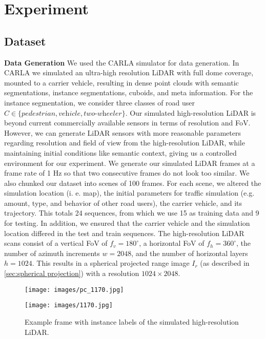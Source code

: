 \section{\large Experiment}
\label{sec:expirement}

\subsection{Dataset}

\textbf{Data Generation}
We used the CARLA simulator for data generation. In CARLA we simulated an ultra-high resolution LiDAR with full dome coverage, mounted to a carrier vehicle, resulting in dense point clouds with semantic segmentations, instance segmentations, cuboids, and meta information. 
For the instance segmentation, we consider three classes of road user $C \in \{\textit{pedestrian},\textit{vehicle},\textit{two-wheeler}\}$. Our simulated high-resolution LiDAR is beyond current commercially available sensors in terms of resolution and FoV. However, we can generate LiDAR sensors with more reasonable parameters regarding resolution and field of view from the high-resolution LiDAR, while maintaining initial conditions like semantic context, giving us a controlled environment for our experiment. 
We generate our simulated LiDAR frames at a frame rate of 1 Hz so that two consecutive frames do not look too similar. We also chunked our dataset into scenes of 100 frames. For each scene, we altered the simulation location (i. e. map), the initial parameters for traffic simulation (e.g. amount, type, and behavior of other road users), the carrier vehicle, and its trajectory. This totals 24 sequences, from which we use 15 as training data and 9 for testing. In addition, we ensured that the carrier vehicle and the simulation location differed in the test and train sequences.
The high-resolution LiDAR scans consist of a vertical FoV of $f_v = 180^\circ$, a horizontal FoV of $f_h = 360^\circ$, the number of azimuth increments $w=2048$, and the number of horizontal layers $h=1024$. This results in a spherical projected range image $I_r$ (as described in \autoref{sec:spherical projection}) with a resolution $1024\times2048$.


\begin{figure}[h]
     \centering

    \begin{minipage}{\columnwidth}
        \centering
        \texttt{[image: images/pc\_1170.jpg]}
    \end{minipage}
    \hfill
    \begin{minipage}{\columnwidth}
        \centering
        \texttt{[image: images/1170.jpg]}
    \end{minipage}
    \caption{Example frame with instance labels of the simulated high-resolution LiDAR.}
    \label{fig:dataset}
\end{figure}


